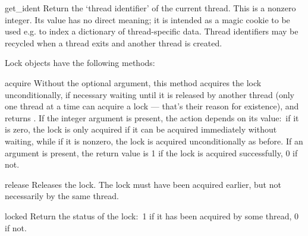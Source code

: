\begin{funcdesc}{get_ident}{}
Return the `thread identifier' of the current thread.  This is a
nonzero integer.  Its value has no direct meaning; it is intended as a
magic cookie to be used e.g. to index a dictionary of thread-specific
data.  Thread identifiers may be recycled when a thread exits and
another thread is created.
\end{funcdesc}

Lock objects have the following methods:

\renewcommand{\indexsubitem}{(lock method)}
\begin{funcdesc}{acquire}{}
Without the optional argument, this method acquires the lock
unconditionally, if necessary waiting until it is released by another
thread (only one thread at a time can acquire a lock --- that's their
reason for existence), and returns .  If the integer
 argument is present, the action depends on its value:\
if it is zero, the lock is only acquired if it can be acquired
immediately without waiting, while if it is nonzero, the lock is
acquired unconditionally as before.  If an argument is present, the
return value is 1 if the lock is acquired successfully, 0 if not.
\end{funcdesc}

\begin{funcdesc}{release}{}
Releases the lock.  The lock must have been acquired earlier, but not
necessarily by the same thread.
\end{funcdesc}

\begin{funcdesc}{locked}{}
Return the status of the lock:\ 1 if it has been acquired by some
thread, 0 if not.
\end{funcdesc}


